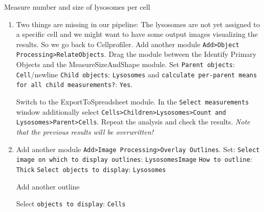 \begin{taskbox}{Measure number and size of lysosomes per cell}
\begin{enumerate}
Now, start the analysis by clicking the \texttt{Analyze Images} button right beside the \texttt{Start Test Mode} button. After the analysis completed you will
find several csv-files on your Desktop. Use your favorite spreadsheet software to explore the contents - 
especially of the \texttt{image.csv}- and \texttt{lysosomes.csv}-file. \emph{Note that size measurements are expressed in pixel units, intensity as normalized intensity from 0 to 1.} Of course you can manually convert the results using
information from the metadata.

\item Two things are missing in our pipeline: The lysosomes are not yet assigned to a specific cell and we
might want to have some output images visualizing the results. So we go back to Cellprofiler. Add
another module \texttt{Add>Object Processing>RelateObjects}. Drag the module between the Identify Primary
Objects and the MeasureSizeAndShape module. Set \newline \texttt{Parent objects}: \texttt{Cell}/newline 
\texttt{Child objects}: \texttt{Lysosomes} \newline
and \texttt{calculate per-parent means for all child measurements?}: \texttt{Yes}.

Switch to the ExportToSpreadsheet module. In the \texttt{Select measurements} window additionally select
\texttt{Cells>Children>Lysosomes>Count and Lysosomes>Parent>Cells}. Repeat the analysis and check the
results. \emph{Note that the previous results will be overwritten!}

\item Add another module \texttt{Add>Image Processing>Overlay Outlines}. Set:\newline
\texttt{Select image on which to display outlines}: \texttt{LysosomesImage}\newline
\texttt{How to outline}: \texttt{Thick}\newline
\texttt{Select objects to display}: \texttt{Lysosomes}

Add another outline

Select \texttt{objects to display}: \texttt{Cells}\newline
	\begin{minipage}[t]{\linewidth}
		\begin{center}
		\medskip
		\label{fig:cpOverlayOutlines}
		\end{center}
	\end{minipage}
	

\end{enumerate}
\end{taskbox}
